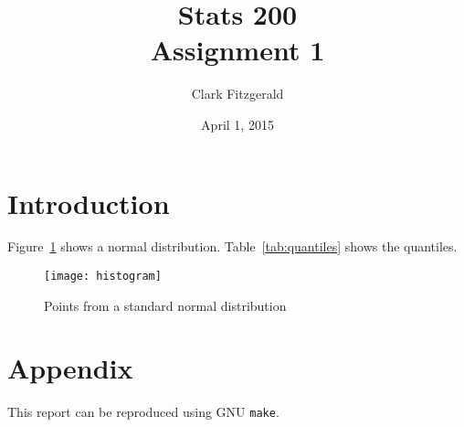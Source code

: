 \documentclass[12pt]{article}
\begin{document}
\title{Stats 200
    \\ Assignment 1}
\date{April 1, 2015}
\author{Clark Fitzgerald}
\maketitle

\section{Introduction}

Figure~\ref{fig:histogram} shows a normal distribution.
Table~\ref{tab:quantiles} shows the quantiles.

\begin{center}

\end{center}

\begin{figure}
    \centering
    \texttt{[image: histogram]}
    \caption{Points from a standard normal distribution}
    \label{fig:histogram}
\end{figure}


\newpage

\section{Appendix}

This report can be reproduced using GNU \texttt{make}.


\end{document}
